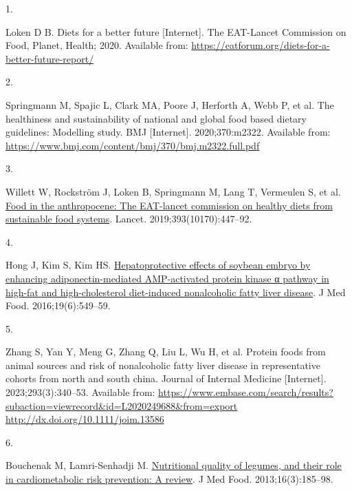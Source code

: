 \documentclass[
  11pt,
  a4paper,
  DIV=11,
  numbers=noendperiod,
  twocolumn]{scrartcl}
\newlength{\cslhangindent}
\newlength{\csllabelwidth}
\newlength{\cslentryspacingunit} %
\newenvironment{CSLReferences}[2] %
 {%
  \setlength{\parindent}{0pt}
  \ifodd #1
  \let\oldpar\par
  \def\par{\hangindent=\cslhangindent\oldpar}
  \fi
  \setlength{\parskip}{#2\cslentryspacingunit}
 }%
 {}
\newcommand{\CSLLeftMargin}[1]{\parbox[t]{\csllabelwidth}{#1}}
\newcommand{\CSLRightInline}[1]{\parbox[t]{\linewidth - \csllabelwidth}{#1}\break}
\begin{document}
\hypertarget{refs}{}
\begin{CSLReferences}{0}{0}
\leavevmode{}%
\CSLLeftMargin{1. }%
\CSLRightInline{Loken D B. Diets for a better future {[}Internet{]}. The
EAT-Lancet Commission on Food, Planet, Health; 2020. Available from:
\url{https://eatforum.org/diets-for-a-better-future-report/}}

\leavevmode{}%
\CSLLeftMargin{2. }%
\CSLRightInline{Springmann M, Spajic L, Clark MA, Poore J, Herforth A,
Webb P, et al. The healthiness and sustainability of national and global
food based dietary guidelines: Modelling study. BMJ {[}Internet{]}.
2020;370:m2322. Available from:
\url{https://www.bmj.com/content/bmj/370/bmj.m2322.full.pdf}}

\leavevmode{}%
\CSLLeftMargin{3. }%
\CSLRightInline{Willett W, Rockström J, Loken B, Springmann M, Lang T,
Vermeulen S, et al.
\href{https://doi.org/10.1016/s0140-6736(18)31788-4}{Food in the
anthropocene: The EAT-lancet commission on healthy diets from
sustainable food systems}. Lancet. 2019;393(10170):447--92. }

\leavevmode{}%
\CSLLeftMargin{4. }%
\CSLRightInline{Hong J, Kim S, Kim HS.
\href{https://doi.org/10.1089/jmf.2015.3604}{Hepatoprotective effects of
soybean embryo by enhancing adiponectin-mediated AMP-activated protein
kinase α pathway in high-fat and high-cholesterol diet-induced
nonalcoholic fatty liver disease}. J Med Food. 2016;19(6):549--59. }

\leavevmode{}%
\CSLLeftMargin{5. }%
\CSLRightInline{Zhang S, Yan Y, Meng G, Zhang Q, Liu L, Wu H, et al.
Protein foods from animal sources and risk of nonalcoholic fatty liver
disease in representative cohorts from north and south china. Journal of
Internal Medicine {[}Internet{]}. 2023;293(3):340--53. Available from:
\href{https://www.embase.com/search/results?subaction=viewrecord\&id=L2020249688\&from=export\%0Ahttp://dx.doi.org/10.1111/joim.13586}{https://www.embase.com/search/results?subaction=viewrecord\&id=L2020249688\&from=export
http://dx.doi.org/10.1111/joim.13586}}

\leavevmode{}%
\CSLLeftMargin{6. }%
\CSLRightInline{Bouchenak M, Lamri-Senhadji M.
\href{https://doi.org/10.1089/jmf.2011.0238}{Nutritional quality of
legumes, and their role in cardiometabolic risk prevention: A review}. J
Med Food. 2013;16(3):185--98. }


\end{CSLReferences}
\end{document}
